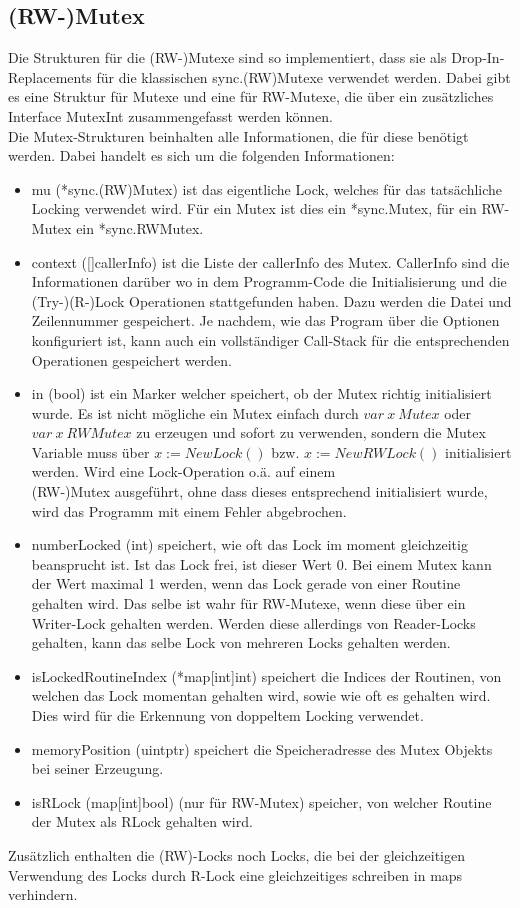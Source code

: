 \subsection{(RW-)Mutex}
Die Strukturen für die (RW-)Mutexe sind so implementiert, dass sie als 
Drop-In-Replacements für die klassischen sync.(RW)Mutexe verwendet werden.
Dabei gibt es eine Struktur für Mutexe und eine für RW-Mutexe, die über ein 
zusätzliches Interface MutexInt zusammengefasst werden können.\\
Die Mutex-Strukturen beinhalten alle Informationen, die für diese benötigt werden.
Dabei handelt es sich um die folgenden Informationen:
\begin{itemize}[leftmargin=1.3em]
  \item mu (*sync.(RW)Mutex) ist das eigentliche Lock, welches für das tatsächliche Locking 
      verwendet wird. Für ein Mutex ist dies ein *sync.Mutex, für ein RW-Mutex
      ein *sync.RWMutex.
  \item context ([]callerInfo) ist die Liste der callerInfo des Mutex.
    CallerInfo sind die Informationen darüber wo in dem Programm-Code die 
    Initialisierung und die (Try-)(R-)Lock Operationen stattgefunden haben. 
    Dazu werden die Datei und Zeilennummer gespeichert. Je nachdem, wie das 
    Program über die Optionen konfiguriert ist, kann auch ein vollständiger 
    Call-Stack für die entsprechenden Operationen gespeichert werden. 
  \item in (bool) ist ein Marker welcher speichert, ob der Mutex richtig 
      initialisiert wurde. Es ist nicht mögliche ein Mutex einfach durch 
      $var\ x\ Mutex$ oder $var\ x\ RWMutex$ zu erzeugen und sofort zu verwenden, 
      sondern die Mutex Variable muss über $x := NewLock()$ bzw. 
      $x := NewRWLock()$ initialisiert werden. Wird eine Lock-Operation o.ä. 
      auf einem\\(RW-)Mutex ausgeführt, ohne dass dieses entsprechend initialisiert
      wurde, wird das Programm mit einem Fehler abgebrochen.
  \item numberLocked (int) speichert, wie oft das Lock im 
      moment gleichzeitig beansprucht ist. Ist das Lock frei, ist dieser Wert $0$.
      Bei einem Mutex kann der Wert maximal 1 werden, wenn das Lock gerade von 
      einer Routine gehalten wird. Das selbe ist wahr für RW-Mutexe, wenn diese 
      über ein Writer-Lock gehalten werden. Werden diese allerdings von 
      Reader-Locks gehalten, kann das selbe Lock von mehreren Locks gehalten 
      werden.
  \item isLockedRoutineIndex (*map[int]int) speichert die Indices der Routinen, von 
    welchen das Lock momentan gehalten wird, sowie wie oft es gehalten wird. 
    Dies wird für die Erkennung von doppeltem Locking verwendet.
  \item memoryPosition (uintptr) speichert die Speicheradresse des 
    Mutex Objekts bei seiner Erzeugung.
  \item isRLock (map[int]bool) (nur für RW-Mutex) speicher, von welcher Routine 
    der Mutex als RLock gehalten wird.
\end{itemize}
Zusätzlich enthalten die (RW)-Locks noch Locks, die bei der gleichzeitigen Verwendung 
des Locks durch R-Lock eine gleichzeitiges schreiben in maps verhindern.   
